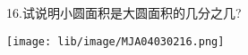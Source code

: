 16.试说明小圆面积是大圆面积的几分之几?

\begin{flushright}

    \texttt{[image: lib/image/MJA04030216.png]}

\end{flushright}



